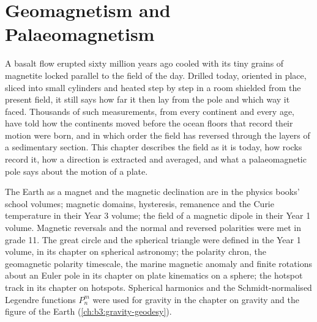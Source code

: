 \chapter{Geomagnetism and Palaeomagnetism}\label{ch:b3:palaeomagnetism}

A basalt flow erupted sixty million years ago cooled with its tiny grains of
magnetite locked parallel to the field of the day. Drilled today, oriented in
place, sliced into small cylinders and heated
step by step in a room shielded from the present field, it still says how far
it then lay from the pole and which way it faced. Thousands of such
measurements, from every continent and every age, have told how the continents
moved before the ocean floors that record their motion were born, and in
which order the field has reversed through the layers of a sedimentary
section. This chapter describes the field as it is today, how rocks record it,
how a direction is extracted and averaged, and what a palaeomagnetic pole says
about the motion of a plate.

\begin{recall}
The Earth as a magnet and the magnetic declination are in the physics books'
school volumes; magnetic domains, hysteresis, remanence and the Curie
temperature in their Year 3 volume; the field of a magnetic dipole in their
Year 1 volume. Magnetic reversals and the normal and reversed polarities were
met in grade 11. The great circle and the spherical triangle were defined in
the Year 1 volume, in its chapter on spherical astronomy; the polarity chron,
the geomagnetic polarity timescale, the marine magnetic anomaly and finite
rotations about an Euler pole in its chapter on plate kinematics on a sphere;
the hotspot track in its chapter on hotspots. Spherical harmonics and the
Schmidt-normalised Legendre functions $P_n^m$ were used for gravity in the
chapter on gravity and the figure of the Earth (\cref{ch:b3:gravity-geodesy}).
\end{recall}

